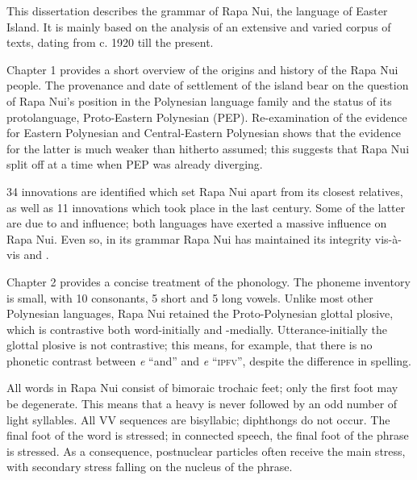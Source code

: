

This dissertation describes the grammar of Rapa Nui, the language of Easter Island. It is mainly based on the analysis of an extensive and varied corpus of texts, dating from c. 1920 till the present.

\medskip Chapter 1 provides a short overview of the origins and history of the Rapa Nui people. The provenance and date of settlement of the island bear on the question of Rapa Nui’s position in the Polynesian language family and the status of its protolanguage, Proto-Eastern Polynesian (PEP). Re-examination of the evidence for Eastern Polynesian and Central-Eastern Polynesian shows that the evidence for the latter is much weaker than hitherto assumed; this suggests that Rapa Nui split off at a time when PEP was already diverging.

34 innovations are identified which set Rapa Nui apart from its closest relatives, as well as 11 innovations which took place in the last century. Some of the latter are due to  and  influence; both languages have exerted a massive influence on Rapa Nui. Even so, in its grammar Rapa Nui has maintained its integrity vis-à-vis  and .

\medskip Chapter 2 provides a concise treatment of the phonology. The phoneme inventory is small, with 10 consonants, 5 short and 5 long vowels. Unlike most other Polynesian languages, Rapa Nui retained the Proto-Polynesian glottal plosive, which is contrastive both word-initially and -medially. Utterance-initially the glottal plosive is not contrastive; this means, for example, that there is no phonetic contrast between \textit{{\ꞌ}e} “and” and \textit{e} “\textsc{ipfv}”, despite the difference in spelling.

All words in Rapa Nui consist of bimoraic trochaic feet; only the first foot may be degenerate. This means that a heavy  is never followed by an odd number of light syllables. All VV sequences are bisyllabic; diphthongs do not occur. The final foot of the word is stressed; in connected speech, the final foot of the phrase is stressed. As a consequence, postnuclear particles often receive the main stress, with secondary stress falling on the nucleus of the phrase.

